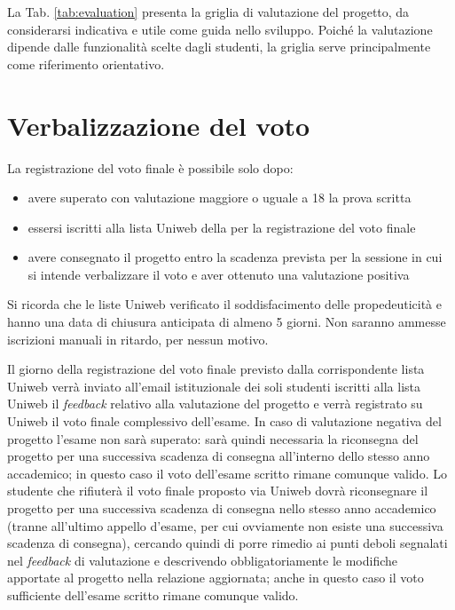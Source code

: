 \documentclass[10pt,a4paper,oneside]{article}
\begin{document}
La Tab. \ref{tab:evaluation} presenta la griglia di valutazione del progetto, da considerarsi indicativa e utile come guida nello sviluppo. Poiché la valutazione dipende dalle funzionalità scelte dagli studenti, la griglia serve principalmente come riferimento orientativo.

\section{Verbalizzazione del voto}
La registrazione del voto finale è possibile solo dopo:
\begin{itemize}
 \item avere superato con valutazione maggiore o uguale a 18 la prova scritta
 \item essersi iscritti alla lista Uniweb della per la registrazione del voto finale
 \item avere consegnato il progetto entro la scadenza prevista per la sessione in cui si intende verbalizzare il voto e aver ottenuto una valutazione positiva
\end{itemize}
Si ricorda che le liste Uniweb verificato il soddisfacimento delle propedeuticità e hanno una data di chiusura anticipata di almeno 5 giorni. Non saranno ammesse iscrizioni manuali in ritardo, per nessun motivo.

Il giorno della registrazione del voto finale previsto dalla corrispondente lista Uniweb verrà inviato all'email istituzionale dei soli studenti iscritti alla lista Uniweb il \emph{feedback} relativo alla valutazione del progetto e verrà registrato su Uniweb il voto finale complessivo dell'esame. In caso di valutazione negativa del progetto l'esame non sarà superato: sarà quindi necessaria la riconsegna del progetto per una successiva scadenza di consegna all'interno dello stesso anno accademico; in questo caso il voto dell'esame scritto rimane comunque valido. Lo studente che rifiuterà il voto finale proposto via Uniweb dovrà riconsegnare il progetto per una successiva scadenza di consegna nello stesso anno accademico (tranne all'ultimo appello d'esame, per cui ovviamente non esiste una successiva scadenza di consegna), cercando quindi di porre rimedio ai punti deboli segnalati nel \emph{feedback} di valutazione e descrivendo obbligatoriamente le modifiche apportate al progetto nella relazione aggiornata; anche in questo caso il voto sufficiente dell'esame scritto rimane comunque valido. 



\end{document}
